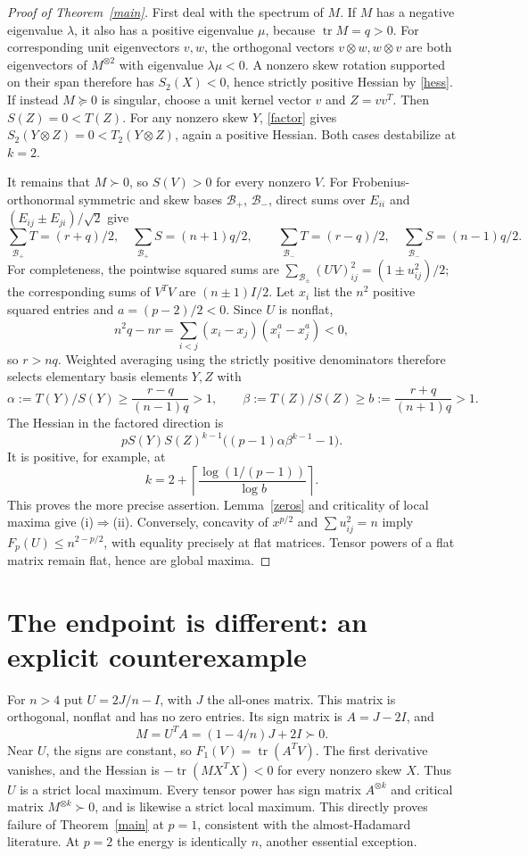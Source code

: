 \documentclass[11pt]{article}
\newcommand{\tr}{\operatorname{tr}}
\begin{document}
\begin{proof}[Proof of Theorem~\ref{main}]
First deal with the spectrum of $M$. If $M$ has a negative eigenvalue
$\lambda$, it also has a positive eigenvalue $\mu$, because $\tr M=q>0$.
For corresponding unit eigenvectors $v,w$, the orthogonal vectors
$v\otimes w,w\otimes v$ are both eigenvectors of $M^{\otimes2}$ with
eigenvalue $\lambda\mu<0$. A nonzero skew rotation supported on their
span therefore has $S_2(X)<0$, hence strictly positive Hessian by
\eqref{hess}. If instead $M\succeq0$ is singular, choose a unit kernel
vector $v$ and $Z=vv^T$. Then $S(Z)=0<T(Z)$. For any nonzero skew
$Y$, \eqref{factor} gives $S_2(Y\otimes Z)=0<T_2(Y\otimes Z)$,
again a positive Hessian. Both cases destabilize at $k=2$.

It remains that $M\succ0$, so $S(V)>0$ for every nonzero $V$.
For Frobenius-orthonormal symmetric and skew bases $\mathcal B_+$,
$\mathcal B_-$, direct sums over $E_{ii}$ and
$(E_{ij}\pm E_{ji})/\sqrt2$ give
\[
 \sum_{\mathcal B_+}T=(r+q)/2,\quad
 \sum_{\mathcal B_+}S=(n+1)q/2,
 \qquad
 \sum_{\mathcal B_-}T=(r-q)/2,\quad
 \sum_{\mathcal B_-}S=(n-1)q/2.
\]
For completeness, the pointwise squared sums are
$\sum_{\mathcal B_\pm}(UV)_{ij}^2=(1\pm u_{ij}^2)/2$;
the corresponding sums of $V^TV$ are $(n\pm1)I/2$.
Let $x_i$ list the $n^2$ positive squared entries and
$a=(p-2)/2<0$. Since $U$ is nonflat,
\[
 n^2q-nr=\sum_{i<j}(x_i-x_j)(x_i^a-x_j^a)<0,
\]
so $r>nq$. Weighted averaging using the strictly positive denominators
therefore selects elementary basis elements $Y,Z$ with
\[
 \alpha:=T(Y)/S(Y)\ge\frac{r-q}{(n-1)q}>1,\qquad
 \beta:=T(Z)/S(Z)\ge b:=\frac{r+q}{(n+1)q}>1.
\]
The Hessian in the factored direction is
\[
 pS(Y)S(Z)^{k-1}\big((p-1)\alpha\beta^{k-1}-1\big).
\]
It is positive, for example, at
\[
 k=2+\left\lceil\frac{\log(1/(p-1))}{\log b}\right\rceil.
\]
This proves the more precise assertion. Lemma~\ref{zeros} and
criticality of local maxima give (i)$\Rightarrow$(ii). Conversely,
concavity of $x^{p/2}$ and $\sum u_{ij}^2=n$ imply
$F_p(U)\le n^{2-p/2}$, with equality precisely at flat matrices.
Tensor powers of a flat matrix remain flat, hence are global maxima.
\end{proof}

\section*{The endpoint is different: an explicit counterexample}
For $n>4$ put $U=2J/n-I$, with $J$ the all-ones matrix. This matrix is
orthogonal, nonflat and has no zero entries. Its sign matrix is
$A=J-2I$, and
\[
 M=U^TA=(1-4/n)J+2I\succ0.
\]
Near $U$, the signs are constant, so $F_1(V)=\tr(A^TV)$.
The first derivative vanishes, and the Hessian is
$-\tr(MX^TX)<0$ for every nonzero skew $X$. Thus $U$ is a strict
local maximum. Every tensor power has sign matrix $A^{\otimes k}$
and critical matrix $M^{\otimes k}\succ0$, and is likewise a strict
local maximum. This directly proves failure of Theorem~\ref{main} at
$p=1$, consistent with the almost-Hadamard literature. At $p=2$ the
energy is identically $n$, another essential exception.
\end{document}
